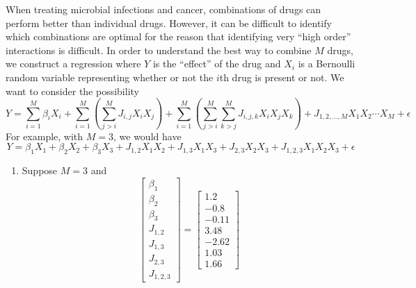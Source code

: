\begin{exercise}
When treating microbial infections and cancer, combinations of drugs can perform better than individual drugs. However, it can be difficult to identify which combinations are optimal for the reason that identifying very ``high order'' interactions is difficult.  In order to understand the best way to combine $M$ drugs, we construct a regression where $Y$ is the ``effect'' of the drug and $X_i$ is a Bernoulli random variable representing whether or not the $i$th drug is present or not. We want to consider the possibility 
\begin{equation*}
Y = \sum_{i=1}^M \beta_iX_i + \sum_{i=1}^M\left(\sum_{j>i}^M J_{i,j}X_iX_j \right)+  \sum_{i=1}^M\left(\sum_{j>i}^M\sum_{k>j}^M  J_{i,j,k}X_iX_jX_k\right) + J_{1,2,\ldots,M}X_1X_2\cdots X_M + \epsilon 
\end{equation*}
For example, with $M=3$, we would have 
\begin{equation*}
Y = \beta_1X_1+\beta_2X_2 + \beta_3X_3 + J_{1,2}X_1X_2 + J_{1,3}X_1X_3 +J_{2,3}X_2X_3+ J_{1,2,3}X_1X_2X_3 + \epsilon 
\end{equation*}
\begin{enumerate}[label=(\alph*)]
\item Suppose $M=3$ and 
\begin{equation*}
\left[\begin{array}{c}
\beta_1\\\beta_2\\\beta_3\\J_{1,2}\\ J_{1,3}\\J_{2,3}\\ J_{1,2,3}
\end{array}\right]=\left[\begin{array}{c} 
1.2\\ -0.8\\ -0.11\\ 3.48\\ -2.62\\1.03\\  1.66
\end{array}\right]
\end{equation*}

\end{enumerate}
\end{exercise}
